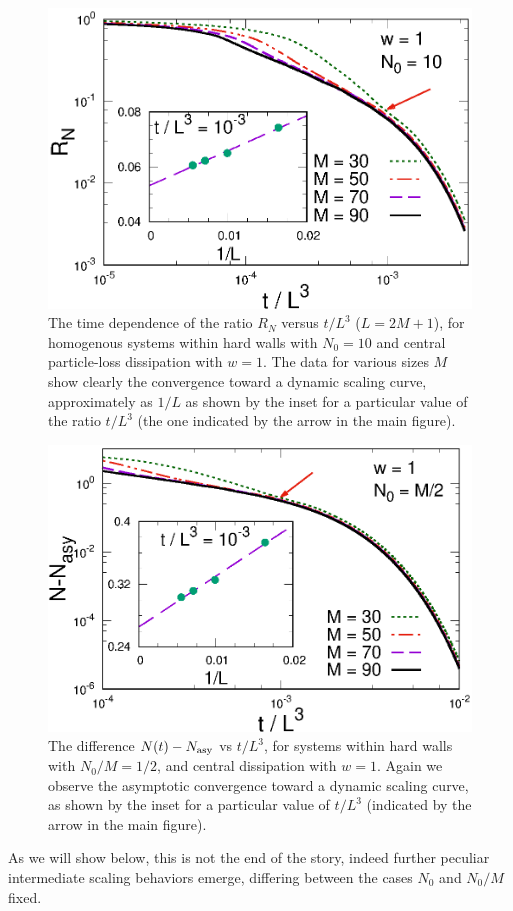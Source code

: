   
  \begin{figure}[!htb]
\centering
    \includegraphics[width=0.65\columnwidth]{imm/NL3.eps}
    \caption{The time dependence of the ratio $R_N$ versus $t/L^3$
      ($L=2M+1$), for homogenous systems within hard walls with $N_0=10$
      and central particle-loss dissipation with $w=1$.  The data for
      various sizes $M$ show clearly the convergence toward a dynamic
      scaling curve, approximately as $1/L$ as shown by the inset for a
      particular value of the ratio $t/L^3$ (the one indicated by the
      arrow in the main figure).}
    \label{rntn010}
  \end{figure}
  
  
  \begin{figure}[!htb]
\centering
    \includegraphics[width=0.65\columnwidth]{imm/dNLL3.eps}
    \caption{The difference $N(t) - N_{\rm asy}$ vs $t/L^3$, for systems
      within hard walls with $N_0/M=1/2$, and central dissipation with
      $w=1$.  Again we observe the asymptotic convergence toward a
      dynamic scaling curve, as shown by the inset for a particular
      value of $t/L^3$ (indicated by the arrow in the main figure).}
    \label{dntln0lasy}
  \end{figure}
  
  As we will show below, this is not the end of the story, indeed
  further peculiar intermediate scaling behaviors emerge, differing
  between the cases $N_0$ and $N_0/M$ fixed.
  
